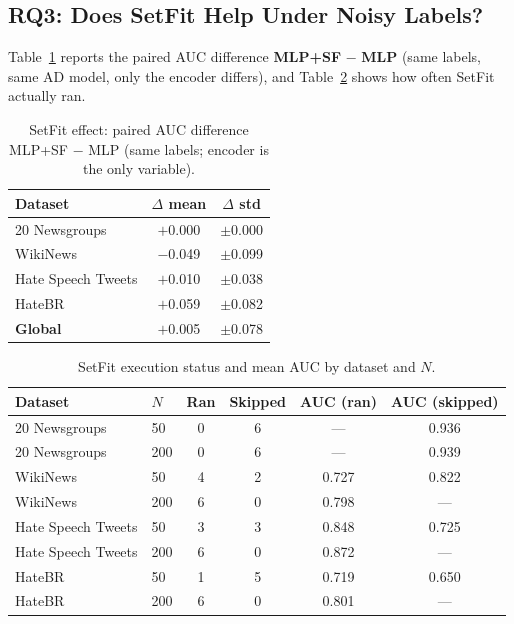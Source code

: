 \documentclass[12pt]{article}
\begin{document}
\subsection{RQ3: Does SetFit Help Under Noisy Labels?}

Table~\ref{tab:setfit-effect} reports the paired AUC difference 
\textbf{MLP+SF} $-$ \textbf{MLP} (same labels, same AD model, only the encoder 
differs), and Table~\ref{tab:setfit-skip} shows how often SetFit actually ran.

\renewcommand{\arraystretch}{0.9}
\begin{table}[ht]
\small
\centering
\caption{SetFit effect: paired AUC difference MLP+SF $-$ MLP (same labels; encoder is the only variable).}
\label{tab:setfit-effect}
\begin{tabular}{lcc}
\toprule
\textbf{Dataset} & $\Delta$ \textbf{mean} & $\Delta$ \textbf{std} \\
\midrule
20 Newsgroups      & $+$0.000 & $\pm$0.000 \\
WikiNews           & $-$0.049 & $\pm$0.099 \\
Hate Speech Tweets & $+$0.010 & $\pm$0.038 \\
HateBR             & $+$0.059 & $\pm$0.082 \\
\midrule
\textbf{Global}    & $+$0.005 & $\pm$0.078 \\
\bottomrule
\end{tabular}
\end{table}

\renewcommand{\arraystretch}{0.9}
\begin{table}[ht]
\small
\centering
\caption{SetFit execution status and mean AUC by dataset and $N$.}
\label{tab:setfit-skip}
\begin{tabular}{llcccc}
\toprule
\textbf{Dataset} & $N$ & \textbf{Ran} & \textbf{Skipped} & \textbf{AUC (ran)} & \textbf{AUC (skipped)} \\
\midrule
20 Newsgroups      & 50  & 0 & 6 & ---   & 0.936 \\
20 Newsgroups      & 200 & 0 & 6 & ---   & 0.939 \\
WikiNews           & 50  & 4 & 2 & 0.727 & 0.822 \\
WikiNews           & 200 & 6 & 0 & 0.798 & ---   \\
Hate Speech Tweets & 50  & 3 & 3 & 0.848 & 0.725 \\
Hate Speech Tweets & 200 & 6 & 0 & 0.872 & ---   \\
HateBR             & 50  & 1 & 5 & 0.719 & 0.650 \\
HateBR             & 200 & 6 & 0 & 0.801 & ---   \\
\bottomrule
\end{tabular}
\end{table}
\end{document}
